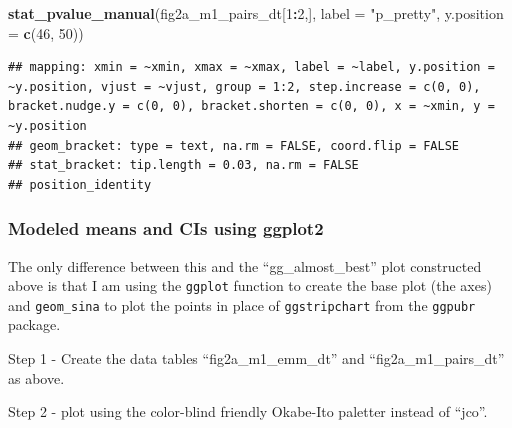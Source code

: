 \documentclass[]{book}
\newenvironment{Shaded}{\begin{snugshade}}{\end{snugshade}}
\newcommand{\DataTypeTok}[1]{\textcolor[rgb]{0.13,0.29,0.53}{#1}}
\newcommand{\DecValTok}[1]{\textcolor[rgb]{0.00,0.00,0.81}{#1}}
\newcommand{\KeywordTok}[1]{\textcolor[rgb]{0.13,0.29,0.53}{\textbf{#1}}}
\newcommand{\NormalTok}[1]{#1}
\newcommand{\OperatorTok}[1]{\textcolor[rgb]{0.81,0.36,0.00}{\textbf{#1}}}
\newcommand{\StringTok}[1]{\textcolor[rgb]{0.31,0.60,0.02}{#1}}
\begin{document}
\begin{Shaded}
\begin{Highlighting}[]
  \KeywordTok{stat_pvalue_manual}\NormalTok{(fig2a_m1_pairs_dt[}\DecValTok{1}\OperatorTok{:}\DecValTok{2}\NormalTok{,],}
                           \DataTypeTok{label =} \StringTok{"p_pretty"}\NormalTok{, }
                           \DataTypeTok{y.position =} \KeywordTok{c}\NormalTok{(}\DecValTok{46}\NormalTok{, }\DecValTok{50}\NormalTok{))}
\end{Highlighting}
\end{Shaded}

\begin{verbatim}
## mapping: xmin = ~xmin, xmax = ~xmax, label = ~label, y.position = ~y.position, vjust = ~vjust, group = 1:2, step.increase = c(0, 0), bracket.nudge.y = c(0, 0), bracket.shorten = c(0, 0), x = ~xmin, y = ~y.position 
## geom_bracket: type = text, na.rm = FALSE, coord.flip = FALSE
## stat_bracket: tip.length = 0.03, na.rm = FALSE
## position_identity
\end{verbatim}

\hypertarget{modeled-means-and-cis-using-ggplot2}{%
\subsubsection{Modeled means and CIs using ggplot2}\label{modeled-means-and-cis-using-ggplot2}}

The only difference between this and the ``gg\_almost\_best'' plot constructed above is that I am using the \texttt{ggplot} function to create the base plot (the axes) and \texttt{geom\_sina} to plot the points in place of \texttt{ggstripchart} from the \texttt{ggpubr} package.

Step 1 - Create the data tables ``fig2a\_m1\_emm\_dt'' and ``fig2a\_m1\_pairs\_dt'' as above.

Step 2 - plot using the color-blind friendly Okabe-Ito paletter instead of ``jco''.
\end{document}
